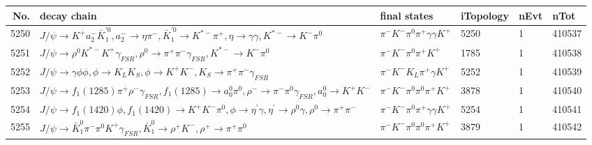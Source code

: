 \begin{table}[htbp] 
\begin{center}
\begin{small}
\begin{tabular}{rlllll}\hline\hline
 No. & decay chain & final states &  iTopology & nEvt & nTot \\\hline
5250&$J/\psi       \rightarrow K^{+}          a_{2}^{-}      \bar{K}_1^{'0}, a_{2}^{-}       \rightarrow \eta          \pi^{-}        , \bar{K}_1^{'0} \rightarrow K^{*-}         \pi^{+}        , \eta           \rightarrow \gamma       \gamma       , K^{*-}          \rightarrow K^{-}          \pi^{0}        $&$\pi^{-}        K^{-}          \pi^{0}        \pi^{+}        \gamma       \gamma       K^{+}          $& 5250&    1&410537\\
5251&$J/\psi       \rightarrow \rho^{0}      K^{*-}         K^{+}          \gamma_{FSR} , \rho^{0}       \rightarrow \pi^{+}        \pi^{-}        \gamma_{FSR} , K^{*-}          \rightarrow K^{-}          \pi^{0}        $&$\pi^{-}        K^{-}          \pi^{0}        \pi^{+}        K^{+}          $& 1785&    1&410538\\
5252&$J/\psi       \rightarrow \gamma       \phi           \phi           , \phi            \rightarrow K_{L}          K_{S}          , \phi            \rightarrow K^{+}          K^{-}          , K_{S}           \rightarrow \pi^{+}        \pi^{-}        \gamma_{FSR} $&$\pi^{-}        K^{-}          K_{L}          \pi^{+}        \gamma       K^{+}          $& 5252&    1&410539\\
5253&$J/\psi       \rightarrow f_{1}(1285)    \pi^{+}        \rho^{-}      \gamma_{FSR} , f_{1}(1285)     \rightarrow a_{0}^{0}      \pi^{0}        , \rho^{-}       \rightarrow \pi^{-}        \pi^{0}        \gamma_{FSR} , a_{0}^{0}       \rightarrow K^{+}          K^{-}          $&$\pi^{-}        K^{-}          \pi^{0}        \pi^{0}        \pi^{+}        K^{+}          $& 3878&    1&410540\\
5254&$J/\psi       \rightarrow f_{1}(1420)    \phi           , f_{1}(1420)     \rightarrow K^{+}          K^{-}          \pi^{0}        , \phi            \rightarrow \eta^{\prime} \gamma       , \eta^{\prime}  \rightarrow \rho^{0}      \gamma       , \rho^{0}       \rightarrow \pi^{+}        \pi^{-}        $&$\pi^{-}        K^{-}          \pi^{0}        \pi^{+}        \gamma       \gamma       K^{+}          $& 5254&    1&410541\\
5255&$J/\psi       \rightarrow \bar{K}_1^{0} \pi^{-}        \pi^{0}        K^{+}          \gamma_{FSR} , \bar{K}_1^{0}  \rightarrow \rho^{+}      K^{-}          , \rho^{+}       \rightarrow \pi^{+}        \pi^{0}        $&$\pi^{-}        K^{-}          \pi^{0}        \pi^{0}        \pi^{+}        K^{+}          $& 3879&    1&410542\\

\end{tabular}
\end{small}
\end{center}
\end{table}
